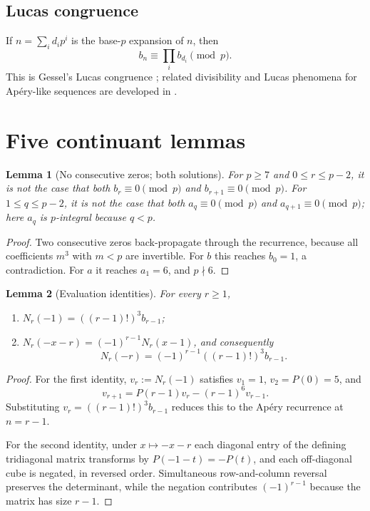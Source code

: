 \documentclass[11pt]{amsart}
\theoremstyle{plain}
\newtheorem{lemma}{Lemma}
\theoremstyle{remark}
\begin{document}
\subsection{Lucas congruence}

If $n=\sum_i d_ip^i$ is the base-$p$ expansion of $n$, then
\[
 b_n\equiv\prod_i b_{d_i}\pmod p.
\]
This is Gessel's Lucas congruence \cite{Gessel1982}; related divisibility
and Lucas phenomena for Ap\'ery-like sequences are developed in
\cite{MalikStraub2016,LucaShparlinski2008}.

\section{Five continuant lemmas}

\begin{lemma}[No consecutive zeros; both solutions]\label{lem:no-consecutive}
For $p\geq7$ and $0\leq r\leq p-2$, it is not the case that both
$b_r\equiv0\pmod p$ and $b_{r+1}\equiv0\pmod p$.  For
$1\leq q\leq p-2$, it is not the case that both
$a_q\equiv0\pmod p$ and $a_{q+1}\equiv0\pmod p$; here $a_q$ is
$p$-integral because $q<p$.
\end{lemma}

\begin{proof}
Two consecutive zeros back-propagate through the recurrence, because all
coefficients $m^3$ with $m<p$ are invertible.  For $b$ this reaches
$b_0=1$, a contradiction.  For $a$ it reaches $a_1=6$, and $p\nmid6$.
\end{proof}

\begin{lemma}[Evaluation identities]\label{lem:evaluation}
For every $r\geq1$,
\begin{enumerate}
\item[(i)] $N_r(-1)=((r-1)!)^3b_{r-1}$;
\item[(ii)] $N_r(-x-r)=(-1)^{r-1}N_r(x-1)$, and consequently
\[
 N_r(-r)=(-1)^{r-1}((r-1)!)^3b_{r-1}.
\]
\end{enumerate}
\end{lemma}

\begin{proof}
For the first identity, $v_r:=N_r(-1)$ satisfies $v_1=1$,
$v_2=P(0)=5$, and
\[
 v_{r+1}=P(r-1)v_r-(r-1)^6v_{r-1}.
\]
Substituting $v_r=((r-1)!)^3b_{r-1}$ reduces this to the Ap\'ery
recurrence at $n=r-1$.

For the second identity, under $x\mapsto-x-r$ each diagonal entry of the
defining tridiagonal matrix transforms by $P(-1-t)=-P(t)$, and each
off-diagonal cube is negated, in reversed order.  Simultaneous
row-and-column reversal preserves the determinant, while the negation
contributes $(-1)^{r-1}$ because the matrix has size $r-1$.
\end{proof}
\end{document}

